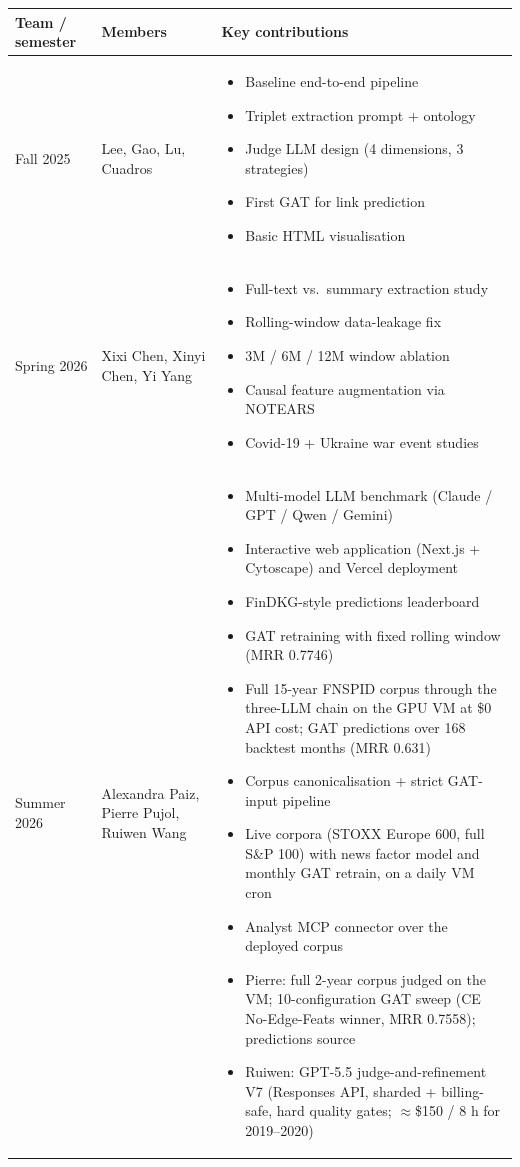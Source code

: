 \documentclass[11pt]{article}
\begin{document}
\begin{longtable}{p{} p{} p{}}
\toprule
\textbf{Team / semester} & \textbf{Members} & \textbf{Key contributions} \\
\midrule
Fall 2025 & Lee, Gao, Lu, Cuadros & \begin{itemize}
    \item Baseline end-to-end pipeline
    \item Triplet extraction prompt + ontology
    \item Judge LLM design (4 dimensions, 3 strategies)
    \item First GAT for link prediction
    \item Basic HTML visualisation
  \end{itemize} \\
\midrule
Spring 2026 & Xixi Chen, Xinyi Chen, Yi Yang & \begin{itemize}
    \item Full-text vs.\ summary extraction study
    \item Rolling-window data-leakage fix
    \item 3M / 6M / 12M window ablation
    \item Causal feature augmentation via NOTEARS
    \item Covid-19 + Ukraine war event studies
  \end{itemize} \\
\midrule
Summer 2026 & Alexandra Paiz, Pierre Pujol, Ruiwen Wang & \begin{itemize}
    \item Multi-model LLM benchmark (Claude / GPT / Qwen / Gemini)
    \item Interactive web application (Next.js + Cytoscape) and Vercel deployment
    \item FinDKG-style predictions leaderboard
    \item GAT retraining with fixed rolling window (MRR 0.7746)
    \item Full 15-year FNSPID corpus through the three-LLM chain on the GPU VM at \$0 API cost; GAT predictions over 168 backtest months (MRR 0.631)
    \item Corpus canonicalisation + strict GAT-input pipeline
    \item Live corpora (STOXX Europe 600, full S\&P 100) with news factor model and monthly GAT retrain, on a daily VM cron
    \item Analyst MCP connector over the deployed corpus
    \item Pierre: full 2-year corpus judged on the VM; 10-configuration GAT sweep (CE No-Edge-Feats winner, MRR 0.7558); predictions source
    \item Ruiwen: GPT-5.5 judge-and-refinement V7 (Responses API, sharded + billing-safe, hard quality gates; \(\approx\)\$150 / 8 h for 2019--2020)
  \end{itemize} \\
\bottomrule
\end{longtable}
\end{document}
